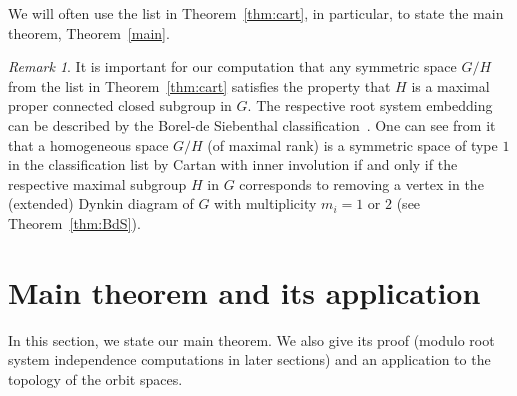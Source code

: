 \documentclass{amsart}
\theoremstyle{definition}
\theoremstyle{remark}
\newtheorem{remark}[theorem]{Remark}
\numberwithin{equation}{section}
\begin{document}
We will often use the list in Theorem~\ref{thm:cart}, in particular, to state the main theorem, Theorem~\ref{main}.

\begin{remark}
It is important for our computation that any symmetric space $G/H$ from the list in Theorem~\ref{thm:cart} satisfies the property that $H$ is a maximal proper connected closed subgroup in $G$.
The respective root system embedding can be described by the Borel-de Siebenthal classification~\cite{BoSi}.
One can see from it that a homogeneous space $G/H$ (of maximal rank) is a symmetric space of type $1$ in the classification list by Cartan with inner involution if and only if the respective maximal subgroup $H$ in $G$ corresponds to removing a vertex in the (extended) Dynkin diagram of $G$ with multiplicity $m_{i}=1$ or $2$ (see Theorem~\ref{thm:BdS}).
\end{remark}

\section{Main theorem and its application}
\label{sect:3}

In this section, we state our main theorem. 
We also give its proof (modulo root system independence computations in later sections) and an application to the topology of the orbit spaces.

\end{document}
